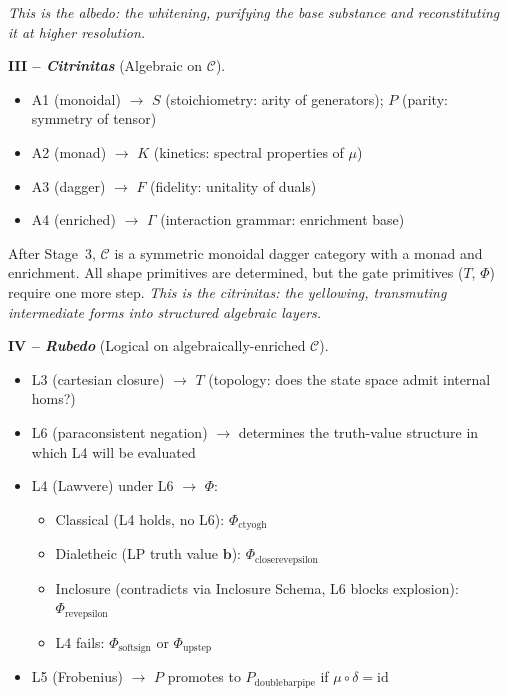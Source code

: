\documentclass[twocolumn]{article}
\begin{document}
\textit{This is the \emph{albedo}: the whitening, purifying the base substance and reconstituting it at higher resolution.}

\bigskip
\noindent\textbf{\large III -- \emph{Citrinitas}} (Algebraic on $\mathcal{C}$).
\begin{itemize}[nosep,leftmargin=1.5em]
  \item A1 (monoidal) $\to$ $S$ (stoichiometry: arity of generators); $P$ (parity: symmetry of tensor)
  \item A2 (monad) $\to$ $K$ (kinetics: spectral properties of $\mu$)
  \item A3 (dagger) $\to$ $F$ (fidelity: unitality of duals)
  \item A4 (enriched) $\to$ $\Gamma$ (interaction grammar: enrichment base)
\end{itemize}

After Stage~3, $\mathcal{C}$ is a symmetric monoidal dagger category with a monad and enrichment. All shape primitives are determined, but the gate primitives ($T$, $\Phi$) require one more step.\newline
\textit{This is the \emph{citrinitas}: the yellowing, transmuting intermediate forms into structured algebraic layers.}

\bigskip
\noindent\textbf{\large IV -- \emph{Rubedo}} (Logical on algebraically-enriched $\mathcal{C}$).
\begin{itemize}[nosep,leftmargin=1.5em]
  \item L3 (cartesian closure) $\to$ $T$ (topology: does the state space admit internal homs?)
  \item L6 (paraconsistent negation) $\to$ determines the truth-value structure in which L4 will be evaluated
  \item L4 (Lawvere) under L6 $\to$ $\Phi$:
  \begin{itemize}[nosep,leftmargin=1em]
    \item[\small $\circ$] Classical (L4 holds, no L6): $\Phi_{\text{ctyogh}}$
    \item[\small $\circ$] Dialetheic (LP truth value $\mathbf{b}$): $\Phi_{\text{closerevepsilon}}$
    \item[\small $\circ$] Inclosure (contradicts via Inclosure Schema, L6 blocks explosion): $\Phi_{\text{revepsilon}}$
    \item[\small $\circ$] L4 fails: $\Phi_{\text{softsign}}$ or $\Phi_{\text{upstep}}$
  \end{itemize}
  \item L5 (Frobenius) $\to$ $P$ promotes to $P_{\text{doublebarpipe}}$ if $\mu \circ \delta = \text{id}$
\end{itemize}
\end{document}
